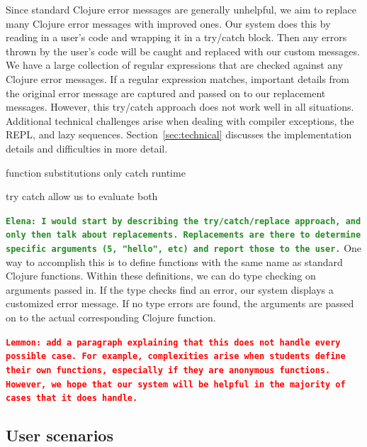 \documentclass[12pt]{article}
\newcommand{\comment}[1]{{\bf \tt  {#1}}}
\newcommand{\emcomment}[1]{\textcolor{ForestGreen}{\comment{Elena: {#1}}}}
\newcommand{\alcomment}[1]{\textcolor{red}{\comment{Lemmon: {#1}}}}
\begin{document}
Since standard Clojure error messages are generally unhelpful, we aim to replace many Clojure error messages with improved ones.
Our system does this by reading in a user's code and wrapping it in a try/catch block.
Then any errors thrown by the user's code will be caught and replaced with our custom messages.
We have a large collection of regular expressions that are checked against any Clojure error messages.
If a regular expression matches, important details from the original error message are captured and passed on to our replacement messages.
However, this try/catch approach does not work well in all situations.
Additional technical challenges arise when dealing with compiler exceptions, the REPL, and lazy sequences.
Section~\ref{sec:technical} discusses the implementation details and difficulties in more detail.

function substitutions only catch runtime

try catch allow us to evaluate both

\emcomment{I would start by describing the try/catch/replace approach, and only then talk about replacements. Replacements are there to determine specific arguments (5, "hello", etc) and report those to the user.}
One way to accomplish this is to define functions with the same name as standard Clojure functions.
Within these definitions, we can do type checking on arguments passed in.
If the type checks find an error, our system displays a customized error message.
If no type errors are found, the arguments are passed on to the actual corresponding Clojure function.

\alcomment{add a paragraph explaining that this does not handle every possible case. For example, complexities arise when students define their own functions, especially if they are anonymous functions. However, we hope that our system will be helpful in the majority of cases that it does handle.}

\subsection{User scenarios}\label{sec:scenarios}
\end{document}
